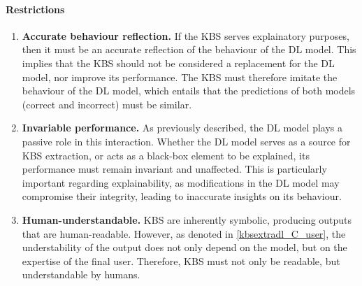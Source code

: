 \paragraph{Restrictions}
\begin{enumerate} [start=1,label={\bfseries R\arabic*.}]
    \item \textbf{Accurate behaviour reflection.} \label{kbsextradl_R_behaviour} If the KBS serves explainatory purposes, then it must be an accurate reflection of the behaviour of the DL model. This implies that the KBS should not be considered a replacement for the DL model, nor improve its performance. The KBS must therefore imitate the behaviour of the DL model, which entails that the predictions of both models (correct and incorrect) must be similar.
    
    \item \textbf{Invariable performance.} \label{kbsextradl_R_performance} As previously described, the DL model plays a passive role in this interaction.  Whether the DL model serves as a source for KBS extraction, or acts as a black-box element to be explained, its performance must remain invariant and unaffected. This is particularly important regarding explainability, as modifications in the DL model may compromise their integrity, leading to inaccurate insights on its behaviour. 
    
    \item \textbf{Human-understandable.} \label{kbsextradl_R_human} KBS are inherently symbolic, producing outputs that are human-readable. However, as denoted in \ref{kbsextradl_C_user}, the understability of the output does not only depend on the model, but on the expertise of the final user. Therefore, KBS must not only be readable, but understandable by humans.
\end{enumerate}

